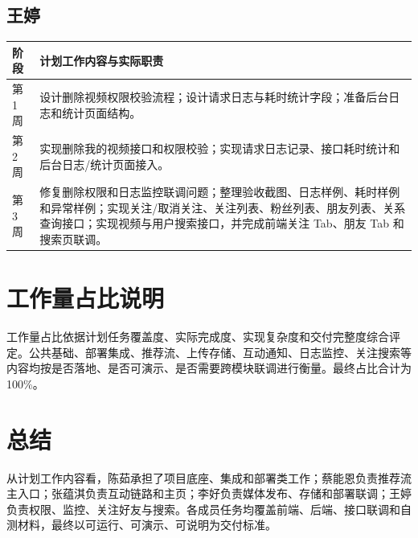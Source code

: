 \documentclass[UTF8,a4paper,12pt,fontset=fandol]{ctexart}
\begin{document}
\subsection{王婷}
\begin{table}[H]
\centering
\small
\begin{tabularx}{\textwidth}{p{1.7cm} X}
\toprule
阶段 & 计划工作内容与实际职责 \\
\midrule
第1周 & 设计删除视频权限校验流程；设计请求日志与耗时统计字段；准备后台日志和统计页面结构。 \\
第2周 & 实现删除我的视频接口和权限校验；实现请求日志记录、接口耗时统计和后台日志/统计页面接入。 \\
第3周 & 修复删除权限和日志监控联调问题；整理验收截图、日志样例、耗时样例和异常样例；实现关注/取消关注、关注列表、粉丝列表、朋友列表、关系查询接口；实现视频与用户搜索接口，并完成前端关注 Tab、朋友 Tab 和搜索页联调。 \\
\bottomrule
\end{tabularx}
\normalsize
\end{table}

\section{工作量占比说明}
工作量占比依据计划任务覆盖度、实际完成度、实现复杂度和交付完整度综合评定。公共基础、部署集成、推荐流、上传存储、互动通知、日志监控、关注搜索等内容均按是否落地、是否可演示、是否需要跨模块联调进行衡量。最终占比合计为 100\%。

\section{总结}
从计划工作内容看，陈茹承担了项目底座、集成和部署类工作；蔡能恩负责推荐流主入口；张蕴淇负责互动链路和主页；李好负责媒体发布、存储和部署联调；王婷负责权限、监控、关注好友与搜索。各成员任务均覆盖前端、后端、接口联调和自测材料，最终以可运行、可演示、可说明为交付标准。
\end{document}
